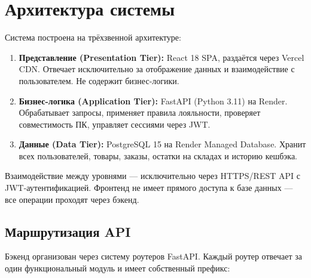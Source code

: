 \documentclass[14pt,a4paper]{extreport}
\begin{document}
\section{Архитектура системы}

Система построена на трёхзвенной архитектуре:
\begin{enumerate}
  \item \textbf{Представление (Presentation Tier):} React 18 SPA, раздаётся через Vercel CDN. Отвечает исключительно за отображение данных и взаимодействие с пользователем. Не содержит бизнес-логики.
  \item \textbf{Бизнес-логика (Application Tier):} FastAPI (Python 3.11) на Render. Обрабатывает запросы, применяет правила лояльности, проверяет совместимость ПК, управляет сессиями через JWT.
  \item \textbf{Данные (Data Tier):} PostgreSQL 15 на Render Managed Database. Хранит всех пользователей, товары, заказы, остатки на складах и историю кешбэка.
\end{enumerate}

Взаимодействие между уровнями — исключительно через HTTPS/REST API с JWT-аутентификацией. Фронтенд не имеет прямого доступа к базе данных — все операции проходят через бэкенд.

\subsection{Маршрутизация API}

Бэкенд организован через систему роутеров FastAPI. Каждый роутер отвечает за один функциональный модуль и имеет собственный префикс:
\end{document}
